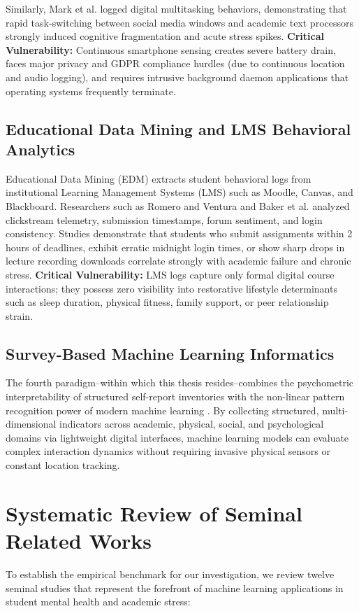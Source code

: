 \documentclass[12pt,a4paper,oneside]{report}
\begin{document}
Similarly, Mark et al. \cite{mark2014stress} logged digital multitasking behaviors, demonstrating that rapid task-switching between social media windows and academic text processors strongly induced cognitive fragmentation and acute stress spikes.
\noindent
\textbf{Critical Vulnerability:} Continuous smartphone sensing creates severe battery drain, faces major privacy and GDPR compliance hurdles (due to continuous location and audio logging), and requires intrusive background daemon applications that operating systems frequently terminate.

\subsection{Educational Data Mining and LMS Behavioral Analytics}
Educational Data Mining (EDM) extracts student behavioral logs from institutional Learning Management Systems (LMS) such as Moodle, Canvas, and Blackboard. Researchers such as Romero and Ventura \cite{romero2020} and Baker et al. \cite{baker2019} analyzed clickstream telemetry, submission timestamps, forum sentiment, and login consistency. Studies demonstrate that students who submit assignments within 2 hours of deadlines, exhibit erratic midnight login times, or show sharp drops in lecture recording downloads correlate strongly with academic failure and chronic stress.
\noindent
\textbf{Critical Vulnerability:} LMS logs capture only formal digital course interactions; they possess zero visibility into restorative lifestyle determinants such as sleep duration, physical fitness, family support, or peer relationship strain.

\subsection{Survey-Based Machine Learning Informatics}
The fourth paradigm--within which this thesis resides--combines the psychometric interpretability of structured self-report inventories with the non-linear pattern recognition power of modern machine learning \cite{bano2022, aljohani2022}. By collecting structured, multi-dimensional indicators across academic, physical, social, and psychological domains via lightweight digital interfaces, machine learning models can evaluate complex interaction dynamics without requiring invasive physical sensors or constant location tracking.

\section{Systematic Review of Seminal Related Works}
\label{sec:systematic_review}
To establish the empirical benchmark for our investigation, we review twelve seminal studies that represent the forefront of machine learning applications in student mental health and academic stress:
\end{document}
